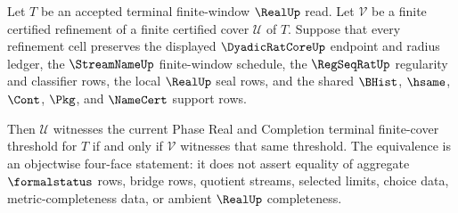 \begin{theorem}
\label{thm:real-l10-terminal-finite-cover-refinement-invariance}
Let $T$ be an accepted terminal finite-window $\RealUp$ read. Let
$\mathcal V$ be a finite certified refinement of a finite certified cover
$\mathcal U$ of $T$. Suppose that every refinement cell preserves the displayed
$\DyadicRatCoreUp$ endpoint and radius ledger, the $\StreamNameUp$
finite-window schedule, the $\RegSeqRatUp$ regularity and classifier rows, the
local $\RealUp$ seal rows, and the shared $\BHist$, $\hsame$, $\Cont$, $\Pkg$,
and $\NameCert$ support rows.

Then $\mathcal U$ witnesses the current Phase Real and Completion terminal
finite-cover threshold for $T$ if and only if $\mathcal V$ witnesses that same
threshold. The equivalence is an objectwise four-face statement: it does not
assert equality of aggregate $\formalstatus$ rows, bridge rows, quotient
streams, selected limits, choice data, metric-completeness data, or ambient
$\RealUp$ completeness.
\end{theorem}
